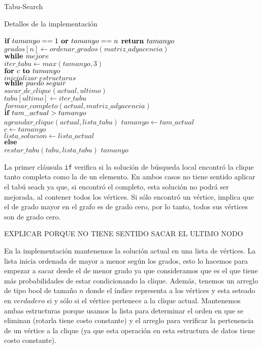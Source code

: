 \begin{section}{Tabu-Search}
\begin{subsection}{Detalles de la implementación}
			\begin{pseudo}
				\tab $\textbf{if } tamanyo==1 \textbf{ or } tamanyo==n$
				\tab \tab $\textbf{return } tamanyo$
				\tab $grados[n] \leftarrow ordenar\_grados(matriz\_adyacencia)$\\
				\tab $\textbf{while } mejore$\\
				\tab \tab $iter\_tabu \leftarrow max(tamanyo,3)$\\
				\tab \tab $\textbf{for } c \textbf{ to } tamanyo$\\
				\tab \tab \tab $inicializar\;estructuras$\\
				\tab \tab \tab $\textbf{while } puedo\;seguir$\\
				\tab \tab \tab \tab $sacar\_de\_clique(actual,ultimo)$\\
				\tab \tab \tab \tab $tabu[ultimo] \leftarrow iter\_tabu$\\
				\tab \tab \tab \tab $formar\_completo(actual,matriz\_adyacencia)$\\
				\tab \tab \tab \tab $\textbf{if } tam\_actual>tamanyo$\\
				\tab \tab \tab \tab \tab $agrandar\_clique(actual,lista\_tabu)$
				\tab \tab \tab \tab \tab $tamanyo \leftarrow tam\_actual$\\
				\tab \tab \tab \tab \tab $c \leftarrow tamanyo$\\
				\tab \tab \tab \tab \tab $lista\_solucion \leftarrow lista\_actual$\\
				\tab \tab \tab \tab $\textbf{else }$\\
				\tab \tab \tab \tab \tab $restar\_tabu(tabu,lista\_tabu)$
				\RET $tamanyo$\\
			\end{pseudo}

		La primer cláusula \texttt{if} verifica si la solución de búsqueda local encontró la clique tanto completa como la de un elemento. En ambos casos no tiene sentido aplicar el tabú seach ya que, si encontró el completo, esta solución no podrá ser mejorada, al contener todos los vértices. Si sólo encontró un vértice, implica que el de grado mayor en el grafo es de grado cero, por lo tanto, todos sus vértices son de grado cero. 

		EXPLICAR PORQUE NO TIENE SENTIDO SACAR EL ULTIMO NODO

		En la implementación mantenemos la solución actual en una lista de vértices. La lista inicia ordenada de mayor a menor según los grados, esto lo hacemos para empezar a sacar desde el de menor grado ya que consideramos que es el que tiene más probabilidades de estar condicionando la clique. Además, tenemos un arreglo de tipo bool de tamaño $n$ donde el índice representa a los vértices y esta seteado en $verdadero$ si y sólo si el vértice pertenece a la clique actual. Mantenemos ambas estructuras porque usamos la lista para determinar el orden en que se eliminan (rotarla tiene costo constante) y el arreglo para verificar la pertenencia de un vértice a la clique (ya que esta operación en esta estructura de datos tiene costo constante).


\end{subsection}
\end{section}
